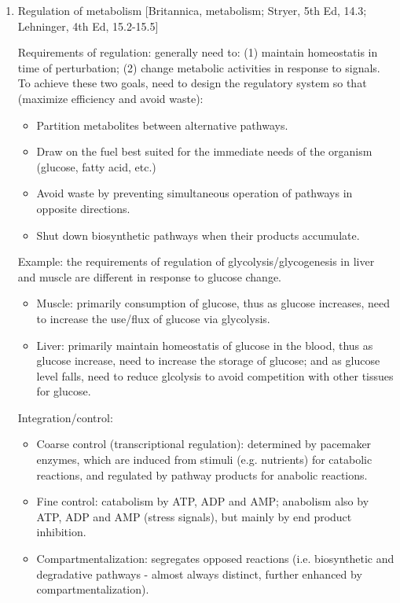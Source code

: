\documentclass{report}
\begin{document}
\begin{enumerate}
\item{Regulation of metabolism} [Britannica, metabolism; Stryer, 5th Ed, 14.3; Lehninger, 4th Ed, 15.2-15.5]


Requirements of regulation: generally need to: (1) maintain homeostatis in time of perturbation; (2) change metabolic activities in response to signals. To achieve these two goals, need to design the regulatory system so that (maximize efficiency and avoid waste): 
\begin{itemize}
	\item Partition metabolites between alternative pathways. 
	\item Draw on the fuel best suited for the immediate needs of the organism (glucose, fatty acid, etc.)
	\item Avoid waste by preventing simultaneous operation of pathways in opposite directions. 
	\item Shut down biosynthetic pathways when their products accumulate.
\end{itemize}

Example: the requirements of regulation of glycolysis/glycogenesis in liver and muscle are different in response to glucose change. 
\begin{itemize}
	\item Muscle: primarily consumption of glucose, thus as glucose increases, need to increase the use/flux of glucose via glycolysis. 
	\item Liver: primarily maintain homeostatis of glucose in the blood, thus as glucose increase, need to increase the storage of glucose; and as glucose level falls, need to reduce glcolysis to avoid competition with other tissues for glucose. 
\end{itemize}

Integration/control: 
\begin{itemize}
	\item Coarse control (transcriptional regulation): determined by pacemaker enzymes, which are induced from stimuli (e.g. nutrients) for catabolic reactions, and regulated by pathway products for anabolic reactions. 
	\item Fine control: catabolism by ATP, ADP and AMP; anabolism also by ATP, ADP and AMP (stress signals), but mainly by end product inhibition. 
	\item Compartmentalization: segregates opposed reactions (i.e. biosynthetic and degradative pathways - almost always distinct, further enhanced by compartmentalization). 
\end{itemize}


\end{enumerate}
\end{document}
